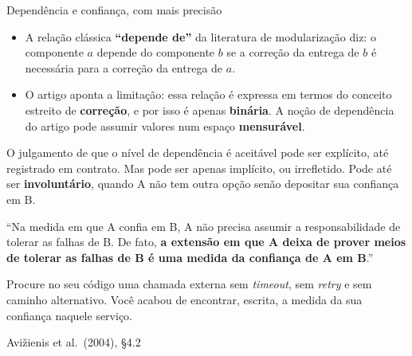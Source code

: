 \documentclass{beamer}
\newcommand{\sect}[1]{\par\smallskip\hfill{\tiny\color{black!55}Avi\v{z}ienis et al.\ (2004), #1}}
\begin{document}
\begin{frame}{Depend\^encia e confian\c{c}a, com mais precis\~ao}
    \footnotesize
    \begin{itemize}
        \item A rela\c{c}\~ao cl\'assica \textbf{``depende de''} da literatura de modulariza\c{c}\~ao diz: o componente $a$ depende do componente $b$ se a corre\c{c}\~ao da entrega de $b$ \'e necess\'aria para a corre\c{c}\~ao da entrega de $a$.
        \item O artigo aponta a limita\c{c}\~ao: essa rela\c{c}\~ao \'e expressa em termos do conceito estreito de \textbf{corre\c{c}\~ao}, e por isso \'e apenas \textbf{bin\'aria}. A no\c{c}\~ao de depend\^encia do artigo pode assumir valores num espa\c{c}o \textbf{mensur\'avel}.
    \end{itemize}
    \medskip
    \begin{defi}
        \scriptsize
        O julgamento de que o n\'ivel de depend\^encia \'e aceit\'avel pode ser expl\'icito, at\'e registrado em contrato. Mas pode ser apenas impl\'icito, ou irrefletido. Pode at\'e ser \textbf{involunt\'ario}, quando A n\~ao tem outra op\c{c}\~ao sen\~ao depositar sua confian\c{c}a em B.
    \end{defi}
    \medskip
    \begin{ancora}
        \footnotesize
        ``Na medida em que A confia em B, A n\~ao precisa assumir a responsabilidade de tolerar as falhas de B. De fato, \textbf{a extens\~ao em que A deixa de prover meios de tolerar as falhas de B \'e uma medida da confian\c{c}a de A em B}.''
    \end{ancora}
    \medskip
    \begin{pratica}
        \scriptsize
        Procure no seu c\'odigo uma chamada externa sem \textit{timeout}, sem \textit{retry} e sem caminho alternativo. Voc\^e acabou de encontrar, escrita, a medida da sua confian\c{c}a naquele servi\c{c}o.
    \end{pratica}
    \sect{\S4.2}
\end{frame}
\end{document}
